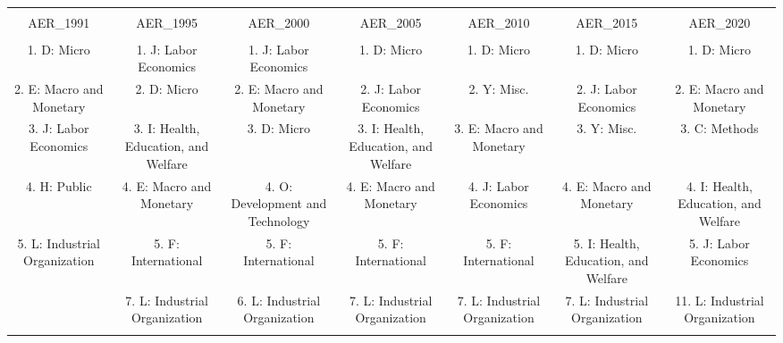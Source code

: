 
\begin{table}[!htbp] \centering 
  \caption{} 
  \label{} 
\scriptsize 
\begin{tabular}{@{\extracolsep{5pt}} ccccccc} 
\\[-1.8ex]\hline 
\hline \\[-1.8ex] 
AER\_1991 & AER\_1995 & AER\_2000 & AER\_2005 & AER\_2010 & AER\_2015 & AER\_2020 \\ 
\hline \\[-1.8ex] 
1. D: Micro & 1. J: Labor Economics & 1. J: Labor Economics & 1. D: Micro & 1. D: Micro & 1. D: Micro & 1. D: Micro \\ 
2. E: Macro and Monetary & 2. D: Micro & 2. E: Macro and Monetary & 2. J: Labor Economics & 2. Y: Misc. & 2. J: Labor Economics & 2. E: Macro and Monetary \\ 
3. J: Labor Economics & 3. I: Health, Education, and Welfare & 3. D: Micro & 3. I: Health, Education, and Welfare & 3. E: Macro and Monetary & 3. Y: Misc. & 3. C: Methods \\ 
4. H: Public & 4. E: Macro and Monetary & 4. O: Development and Technology & 4. E: Macro and Monetary & 4. J: Labor Economics & 4. E: Macro and Monetary & 4. I: Health, Education, and Welfare \\ 
5. L: Industrial Organization & 5. F: International & 5. F: International & 5. F: International & 5. F: International & 5. I: Health, Education, and Welfare & 5. J: Labor Economics \\ 
 & 7. L: Industrial Organization & 6. L: Industrial Organization & 7. L: Industrial Organization & 7. L: Industrial Organization & 7. L: Industrial Organization & 11. L: Industrial Organization \\ 
\hline \\[-1.8ex] 
\end{tabular} 
\end{table} 
